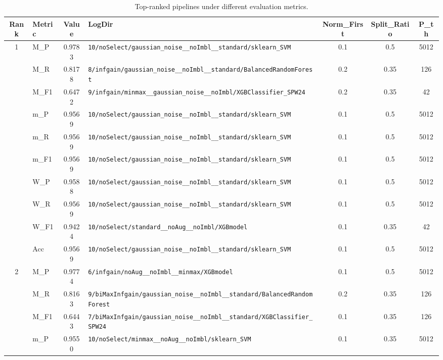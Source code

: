 \begin{table}[htbp]
\caption{Top-ranked pipelines under different evaluation metrics.}
\label{tab:rank_metric_vertical}
\centering
\small
\setlength{\tabcolsep}{4pt}
\begin{tabular}{|c|l|c|>{\ttfamily\footnotesize}p{7.2cm}|c|c|c|}
\hline
Rank & Metric & Value & LogDir & Norm\_First & Split\_Ratio & P\_th \\
\hline
\multirow{10}{*}{1} & M\_P & 0.9783 & \texttt{10/noSelect/gaussian\_noise\_\_noImbl\_\_standard/sklearn\_SVM} & 0.1 & 0.5  & 5012 \\ 
 & M\_R & 0.8178 & \texttt{8/infgain/gaussian\_noise\_\_noImbl\_\_standard/BalancedRandomForest} & 0.2 & 0.35  & 126 \\ 
 & M\_F1 & 0.6472 & \texttt{9/infgain/minmax\_\_gaussian\_noise\_\_noImbl/XGBClassifier\_SPW24} & 0.2 & 0.35  & 42 \\ 
 & m\_P & 0.9569 & \texttt{10/noSelect/gaussian\_noise\_\_noImbl\_\_standard/sklearn\_SVM} & 0.1 & 0.5  & 5012 \\ 
 & m\_R & 0.9569 & \texttt{10/noSelect/gaussian\_noise\_\_noImbl\_\_standard/sklearn\_SVM} & 0.1 & 0.5  & 5012 \\ 
 & m\_F1 & 0.9569 & \texttt{10/noSelect/gaussian\_noise\_\_noImbl\_\_standard/sklearn\_SVM} & 0.1 & 0.5  & 5012 \\ 
 & W\_P & 0.9588 & \texttt{10/noSelect/gaussian\_noise\_\_noImbl\_\_standard/sklearn\_SVM} & 0.1 & 0.5  & 5012 \\ 
 & W\_R & 0.9569 & \texttt{10/noSelect/gaussian\_noise\_\_noImbl\_\_standard/sklearn\_SVM} & 0.1 & 0.5  & 5012 \\ 
 & W\_F1 & 0.9424 & \texttt{10/noSelect/standard\_\_noAug\_\_noImbl/XGBmodel} & 0.1 & 0.35  & 42 \\ 
 & Acc & 0.9569 & \texttt{10/noSelect/gaussian\_noise\_\_noImbl\_\_standard/sklearn\_SVM} & 0.1 & 0.5  & 5012 \\ 
\hline
\multirow{10}{*}{2} & M\_P & 0.9774 & \texttt{6/infgain/noAug\_\_noImbl\_\_minmax/XGBmodel} & 0.1 & 0.5  & 5012 \\ 
 & M\_R & 0.8163 & \texttt{9/biMaxInfgain/gaussian\_noise\_\_noImbl\_\_standard/BalancedRandomForest} & 0.2 & 0.35  & 126 \\ 
 & M\_F1 & 0.6443 & \texttt{7/biMaxInfgain/gaussian\_noise\_\_noImbl\_\_standard/XGBClassifier\_SPW24} & 0.1 & 0.35  & 126 \\ 
 & m\_P & 0.9550 & \texttt{10/noSelect/minmax\_\_noAug\_\_noImbl/sklearn\_SVM} & 0.1 & 0.35  & 5012 \\ 

\end{tabular}
\end{table}
